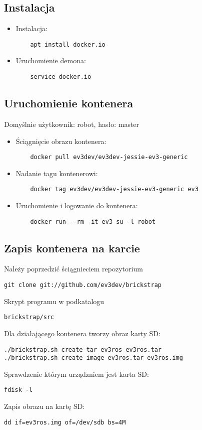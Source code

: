 \documentclass{article}
\begin{document}
\subsection{Instalacja}

\begin{itemize}
	\item Instalacja: 
	\begin{lstlisting}
	apt install docker.io
	\end{lstlisting}
	\item Uruchomienie demona: 
	\begin{lstlisting}
	service docker.io
	\end{lstlisting}
\end{itemize}

\subsection{Uruchomienie kontenera}
Domyślnie użytkownik: robot, hasło: master
\begin{itemize}
	\item Ściągnięcie obrazu kontenera: 
	\begin{lstlisting}
	docker pull ev3dev/ev3dev-jessie-ev3-generic
	\end{lstlisting}
	\item Nadanie tagu kontenerowi: 
	\begin{lstlisting}
	docker tag ev3dev/ev3dev-jessie-ev3-generic ev3
	\end{lstlisting}
	\item Uruchomienie i logowanie do kontenera: 
	\begin{lstlisting}
	docker run --rm -it ev3 su -l robot
	\end{lstlisting}
\end{itemize}

\subsection{Zapis kontenera na karcie}
Należy poprzedzić ściągnieciem repozytorium
\begin{lstlisting}
git clone git://github.com/ev3dev/brickstrap
\end{lstlisting}
Skrypt programu w podkatalogu
\begin{lstlisting}
brickstrap/src
\end{lstlisting}
Dla działającego kontenera tworzy obraz karty SD:
\begin{lstlisting}
./brickstrap.sh create-tar ev3ros ev3ros.tar
./brickstrap.sh create-image ev3ros.tar ev3ros.img
\end{lstlisting}

Sprawdzenie którym urządzniem jest karta SD:
\begin{lstlisting}
fdisk -l
\end{lstlisting}

Zapis obrazu na kartę SD:
\begin{lstlisting}
dd if=ev3ros.img of=/dev/sdb bs=4M
\end{lstlisting}
\end{document}
